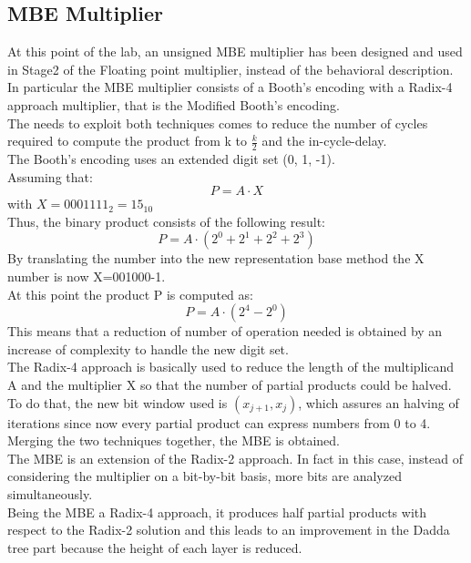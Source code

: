 \documentclass[a4paper, titlepage]{article}
\begin{document}
\subsection{MBE Multiplier}
At this point of the lab, an unsigned MBE multiplier has been designed and used in Stage2 of the Floating point multiplier, instead of the behavioral description.\\ In particular the MBE multiplier consists of a Booth's encoding with a Radix-4 approach multiplier, that is the Modified Booth's encoding.\\
The needs to exploit both techniques comes to reduce the number of cycles required to compute the product from k to $\frac{k}{2}$ and the in-cycle-delay.\\
The Booth's encoding uses an extended digit set (0, 1, -1).\\Assuming that:
\begin{equation}
    P=A\cdot X 
\end{equation}
with $X=0001111_2=15_{10}$\\
\newline
Thus, the binary product consists of the following result:
\begin{equation}
    P=A\cdot(2^0 + 2^1 + 2^2 + 2^3)
\end{equation}
By translating the number into the new representation base method the X number is now X=001000-1.\\At this point the product P is computed as:
\begin{equation}
    P=A\cdot (2^4 - 2^0)
\end{equation}
This means that a reduction of number of operation needed is obtained by an increase of complexity to handle the new digit set.\\
The Radix-4 approach is basically used to reduce the length of the multiplicand A and the multiplier X so that the number of partial products could be halved.\\To do that, the new bit window used is $(x_{j+1}, x_{j})$, which assures an halving of iterations since now every partial product can express numbers from 0 to 4.
\\
Merging the two techniques together, the MBE is obtained.\\
The MBE is an extension of the Radix-2 approach. In fact in this case, instead of considering the multiplier on a bit-by-bit basis, more bits are analyzed simultaneously.\\Being the MBE a Radix-4 approach, it produces half partial products with respect to the Radix-2 solution and this leads to an improvement in %
the Dadda tree part because the height of each layer is reduced.
\newpage
\end{document}

